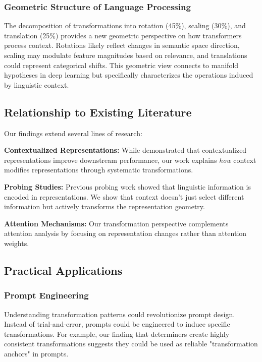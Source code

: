 \subsubsection{Geometric Structure of Language Processing}

The decomposition of transformations into rotation (45\%), scaling (30\%), and translation (25\%) provides a new geometric perspective on how transformers process context. Rotations likely reflect changes in semantic space direction, scaling may modulate feature magnitudes based on relevance, and translations could represent categorical shifts. This geometric view connects to manifold hypotheses in deep learning \cite{bengio2013representation} but specifically characterizes the operations induced by linguistic context.

\subsection{Relationship to Existing Literature}

Our findings extend several lines of research:

\textbf{Contextualized Representations:} While \cite{peters2018deep} demonstrated that contextualized representations improve downstream performance, our work explains \textit{how} context modifies representations through systematic transformations.

\textbf{Probing Studies:} Previous probing work \cite{hewitt2019structural} showed that linguistic information is encoded in representations. We show that context doesn't just select different information but actively transforms the representation geometry.

\textbf{Attention Mechanisms:} Our transformation perspective complements attention analysis \cite{clark2019does} by focusing on representation changes rather than attention weights.

\subsection{Practical Applications}

\subsubsection{Prompt Engineering}
Understanding transformation patterns could revolutionize prompt design. Instead of trial-and-error, prompts could be engineered to induce specific transformations. For example, our finding that determiners create highly consistent transformations suggests they could be used as reliable "transformation anchors" in prompts.

